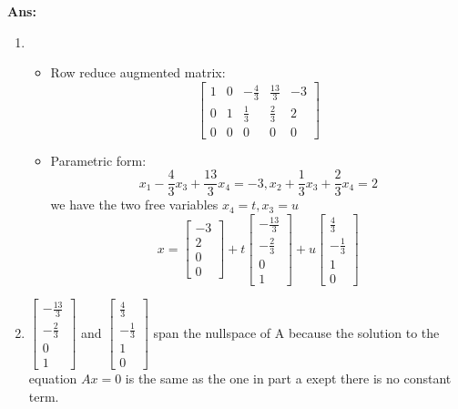 \documentclass[12pt,a4paper]{amsart}
\newcommand\sol[1]{
\medskip
\begin{mdframed}
\textbf{Ans:\\} #1
\end{mdframed}
\medskip
}
\begin{document}
\begin{enumerate}
\sol{
  \begin{enumerate}
    \item
    \begin{itemize}
      \item Row reduce augmented matrix:\\
        $$ \left[\begin{matrix}
        1 & 0 & -\frac{4}{3} & \frac{13}{3} & -3 \\
        0 & 1 & \frac{1}{3} & \frac{2}{3} & 2 \\ 
        0 & 0 & 0 & 0 & 0 
        \end{matrix}\right] $$
      \item Parametric form:\\
        $$x_1 -\frac{4}{3}x_3+\frac{13}{3}x_4 = -3, x_2 + \frac{1}{3}x_3 + \frac{2}{3}x_4 = 2$$ we have the two free variables $x_4=t, x_3=u$
        $$x = \left[\begin{matrix} -3 \\ 2 \\ 0 \\ 0 \end{matrix}\right] 
        +    t\left[\begin{matrix} -\frac{13}{3} \\ -\frac{2}{3} \\ 0 \\ 1 \end{matrix}\right] 
        +    u\left[\begin{matrix} \frac{4}{3} \\ -\frac{1}{3} \\ 1 \\ 0 \end{matrix}\right] $$
    \end{itemize}
    \item
      $\left[\begin{matrix} -\frac{13}{3} \\ -\frac{2}{3} \\ 0 \\ 1 \end{matrix}\right]$ and 
        $\left[\begin{matrix} \frac{4}{3} \\ -\frac{1}{3} \\ 1 \\ 0 \end{matrix}\right]$ span the nullspace of A
        because the solution to the equation $Ax=0$ is the same as the one in part a exept there is no constant term.
  \end{enumerate}
}
 


\end{enumerate}
\end{document}
